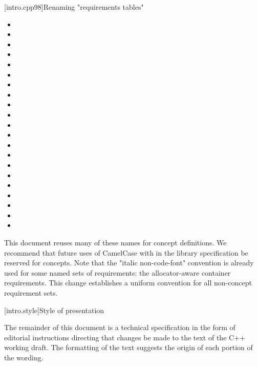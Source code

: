 [intro.cpp98]{Renaming "requirements tables"}

\pnum
{}
\begin{itemize}
\item {}
\item {}
\item {}
\item {}
\item {}
\item {}
\item {}
\item {}
\item {}
\item {}
\item {}
\item {}
\item {}
\item {}
\item {}
\item {}
\item {}
\item {}
\item {}
\item {}
\item {}
\end{itemize}
This document reuses many of these names for concept definitions. We recommend
that future uses of CamelCase with  in the library specification
be reserved for concepts. Note that the "italic non-code-font" convention is
already used for some named sets of requirements: the allocator-aware container
requirements. This change establishes a uniform convention for all non-concept
requirement sets.


[intro.style]{Style of presentation}

\pnum
The remainder of this document is a technical specification in the form of
editorial instructions directing that changes be made to the text of the C++
working draft. The formatting of the text suggests the origin of each portion of
the wording.

